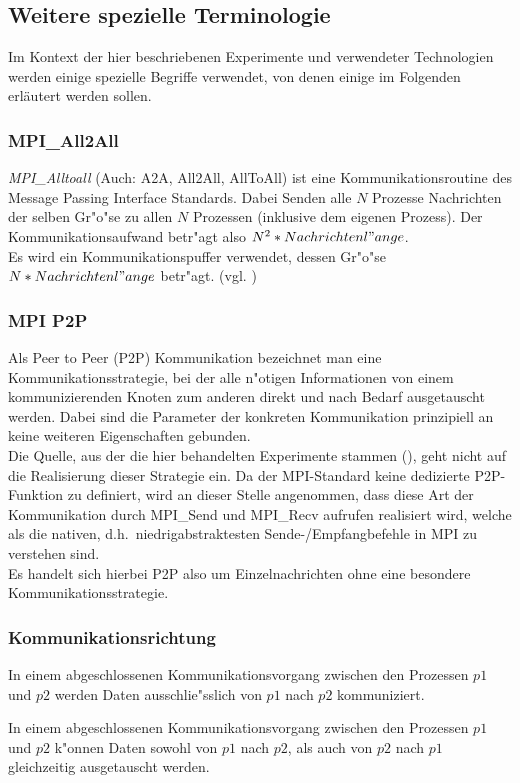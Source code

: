 \subsection{Weitere spezielle Terminologie}
Im Kontext der hier beschriebenen Experimente und verwendeter Technologien  werden einige spezielle Begriffe verwendet, von denen einige im Folgenden erläutert werden sollen.

\subsubsection{MPI\_All2All}
\textit{MPI\_Alltoall} (Auch: A2A, All2All, AllToAll) ist eine Kommunikationsroutine des Message Passing Interface Standards. Dabei Senden alle $N$ Prozesse Nachrichten der selben Gr"o"se zu allen $N$ Prozessen (inklusive dem eigenen Prozess). Der Kommunikationsaufwand betr"agt also $N^2 * Nachrichtenl"ange$.\\
Es wird ein Kommunikationspuffer verwendet, dessen Gr"o"se $N*Nachrichtenl"ange$ betr"agt. (vgl. \cite{MPImanpage})\\

\subsubsection{MPI P2P}
Als Peer to Peer (P2P) Kommunikation bezeichnet man eine Kommunikationsstrategie, bei der alle n"otigen Informationen von einem kommunizierenden Knoten zum anderen direkt und nach Bedarf ausgetauscht werden. 
Dabei sind die Parameter der konkreten Kommunikation prinzipiell an keine weiteren Eigenschaften gebunden.\\
Die Quelle, aus der die hier behandelten Experimente stammen (\cite{mainpaper}), geht nicht auf die Realisierung dieser Strategie ein. Da der MPI-Standard keine dedizierte P2P-Funktion zu definiert, wird an dieser Stelle angenommen, dass diese Art der Kommunikation durch MPI\_Send und MPI\_Recv aufrufen realisiert wird, welche als die nativen, d.h.~niedrigabstraktesten Sende-/Empfangbefehle in MPI zu verstehen sind.\\
Es handelt sich hierbei P2P also um Einzelnachrichten ohne eine besondere Kommunikationsstrategie.\\

\subsubsection{Kommunikationsrichtung}
\begin{defi}
In einem abgeschlossenen Kommunikationsvorgang zwischen den Prozessen $p1$ und $p2$ werden Daten ausschlie"sslich von $p1$ nach $p2$ kommuniziert.
\end{defi}
\begin{defi}
In einem abgeschlossenen Kommunikationsvorgang zwischen den Prozessen $p1$ und $p2$ k"onnen Daten sowohl von $p1$ nach $p2$, als auch von $p2$ nach $p1$ gleichzeitig ausgetauscht werden.
\end{defi}


